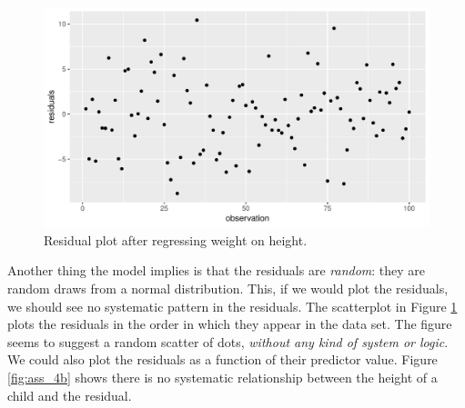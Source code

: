 \documentclass[]{book}\usepackage[]{graphicx}\usepackage[]{color}
\makeatletter
\def\maxwidth{ %
  \ifdim\Gin@nat@width>\linewidth
    \linewidth
  \else
    \Gin@nat@width
  \fi
}
\newenvironment{knitrout}{}{} %
\makeatother
\begin{document}
\begin{knitrout}
\color{fgcolor}\begin{figure}

{\centering \includegraphics[width=\maxwidth]{figure/ass_4-1} 

}

\caption[Residual plot after regressing weight on height]{Residual plot after regressing weight on height.}\label{fig:ass_4}
\end{figure}


\end{knitrout}

Another thing the model implies is that the residuals are \textit{random}: they are random draws from a normal distribution. This, if we would plot the residuals, we should see no systematic pattern in the residuals. The scatterplot in Figure \ref{fig:ass_4} plots the residuals in the order in which they appear in the data set. The figure seems to suggest a random scatter of dots, \textit{without any kind of system or logic}. We could also plot the residuals as a function of their predictor value. Figure \ref{fig:ass_4b} shows there is no systematic relationship between the height of a child and the residual.  
\end{document}
